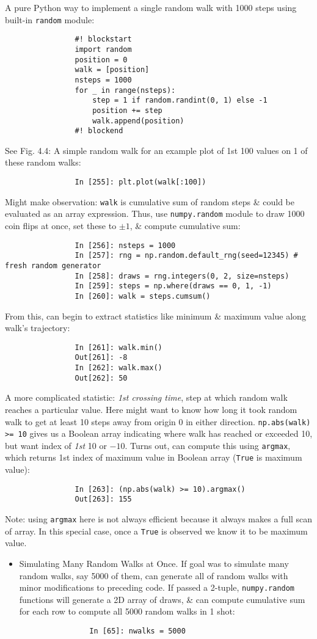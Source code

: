 \documentclass{article}
\begin{document}
\begin{enumerate}
\begin{itemize}
\begin{itemize}
			A pure Python way to implement a single random walk with 1000 steps using built-in {\tt random} module:
			\begin{verbatim}
				#! blockstart
				import random
				position = 0
				walk = [position]
				nsteps = 1000
				for _ in range(nsteps):
				    step = 1 if random.randint(0, 1) else -1
				    position += step
				    walk.append(position)
				#! blockend
			\end{verbatim}
			See {\sf Fig. 4.4: A simple random walk} for an example plot of 1st 100 values on 1 of these random walks:
			\begin{verbatim}
				In [255]: plt.plot(walk[:100])
			\end{verbatim}
			Might make observation: {\tt walk} is cumulative sum of random steps \& could be evaluated as an array expression. Thus, use {\tt numpy.random} module to draw 1000 coin flips at once, set these to $\pm1$, \& compute cumulative sum:
			\begin{verbatim}
				In [256]: nsteps = 1000
				In [257]: rng = np.random.default_rng(seed=12345) # fresh random generator
				In [258]: draws = rng.integers(0, 2, size=nsteps)
				In [259]: steps = np.where(draws == 0, 1, -1)
				In [260]: walk = steps.cumsum()
			\end{verbatim}
			From this, can begin to extract statistics like minimum \& maximum value along walk's trajectory:
			\begin{verbatim}
				In [261]: walk.min()
				Out[261]: -8
				In [262]: walk.max()
				Out[262]: 50
			\end{verbatim}
			A more complicated statistic: {\it1st crossing time}, step at which random walk reaches a particular value. Here might want to know how long it took random walk to get at least 10 steps away from origin 0 in either direction. {\tt np.abs(walk) >= 10} gives us a Boolean array indicating where walk has reached or exceeded 10, but want index of {\it1st} 10 or $-10$. Turns out, can compute this using {\tt argmax}, which returns 1st index of maximum value in Boolean array ({\tt True} is maximum value):
			\begin{verbatim}
				In [263]: (np.abs(walk) >= 10).argmax()
				Out[263]: 155
			\end{verbatim}
			Note: using {\tt argmax} here is not always efficient because it always makes a full scan of array. In this special case, once a {\tt True} is observed we know it to be maximum value. 
			\begin{itemize}
				\item {\sf Simulating Many Random Walks at Once.} If goal was to simulate many random walks, say 5000 of them, can generate all of random walks with minor modifications to preceding code. If passed a 2-tuple, {\tt numpy.random} functions will generate a 2D array of draws, \& can compute cumulative sum for each row to compute all 5000 random walks in 1 shot:
				\begin{verbatim}
				In [65]: nwalks = 5000
				

\end{verbatim}
\end{itemize}
\end{itemize}
\end{itemize}
\end{enumerate}
\end{document}
